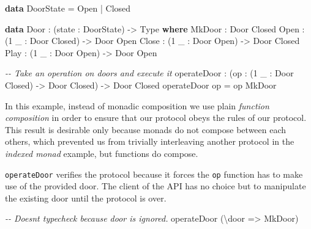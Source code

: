 \documentclass[
]{article}
\newenvironment{Shaded}{}{}
\newcommand{\CommentTok}[1]{\textcolor[rgb]{0.38,0.63,0.69}{\textit{#1}}}
\newcommand{\DataTypeTok}[1]{\textcolor[rgb]{0.56,0.13,0.00}{#1}}
\newcommand{\DecValTok}[1]{\textcolor[rgb]{0.25,0.63,0.44}{#1}}
\newcommand{\KeywordTok}[1]{\textcolor[rgb]{0.00,0.44,0.13}{\textbf{#1}}}
\newcommand{\NormalTok}[1]{#1}
\newcommand{\OperatorTok}[1]{\textcolor[rgb]{0.40,0.40,0.40}{#1}}
\newcommand{\OtherTok}[1]{\textcolor[rgb]{0.00,0.44,0.13}{#1}}
\begin{document}
\begin{Shaded}
\begin{Highlighting}[]

\KeywordTok{data} \DataTypeTok{DoorState} \OtherTok{=} \DataTypeTok{Open} \OperatorTok{|} \DataTypeTok{Closed}

\KeywordTok{data} \DataTypeTok{Door} \OperatorTok{:}\NormalTok{ (state }\OperatorTok{:} \DataTypeTok{DoorState}\NormalTok{) }\OtherTok{{-}\textgreater{}} \DataTypeTok{Type} \KeywordTok{where}
  \DataTypeTok{MkDoor} \OperatorTok{:} \DataTypeTok{Door} \DataTypeTok{Closed}
  \DataTypeTok{Open} \OperatorTok{:}\NormalTok{ (}\DecValTok{1}\NormalTok{ \_ }\OperatorTok{:} \DataTypeTok{Door} \DataTypeTok{Closed}\NormalTok{) }\OtherTok{{-}\textgreater{}} \DataTypeTok{Door} \DataTypeTok{Open}
  \DataTypeTok{Close} \OperatorTok{:}\NormalTok{ (}\DecValTok{1}\NormalTok{ \_ }\OperatorTok{:} \DataTypeTok{Door} \DataTypeTok{Open}\NormalTok{) }\OtherTok{{-}\textgreater{}} \DataTypeTok{Door} \DataTypeTok{Closed}
  \DataTypeTok{Play} \OperatorTok{:}\NormalTok{ (}\DecValTok{1}\NormalTok{ \_ }\OperatorTok{:} \DataTypeTok{Door} \DataTypeTok{Open}\NormalTok{) }\OtherTok{{-}\textgreater{}} \DataTypeTok{Door} \DataTypeTok{Open}

\CommentTok{{-}{-} Take an operation on doors and execute it}
\NormalTok{operateDoor }\OperatorTok{:}\NormalTok{ (op }\OperatorTok{:}\NormalTok{ (}\DecValTok{1}\NormalTok{ \_ }\OperatorTok{:} \DataTypeTok{Door} \DataTypeTok{Closed}\NormalTok{) }\OtherTok{{-}\textgreater{}} \DataTypeTok{Door} \DataTypeTok{Closed}\NormalTok{)}
           \OtherTok{{-}\textgreater{}} \DataTypeTok{Door} \DataTypeTok{Closed}
\NormalTok{operateDoor op }\OtherTok{=}\NormalTok{ op }\DataTypeTok{MkDoor}
\end{Highlighting}
\end{Shaded}

In this example, instead of monadic composition we use plain
\emph{function composition} in order to ensure that our protocol obeys
the rules of our protocol. This result is desirable only because monads
do not compose between each others, which prevented us from trivially
interleaving another protocol in the \emph{indexed monad} example, but
functions do compose.

\texttt{operateDoor} verifies the protocol because it forces the
\texttt{op} function has to make use of the provided door. The client of
the API has no choice but to manipulate the existing door until the
protocol is over.

\begin{Shaded}
\begin{Highlighting}[]
\CommentTok{{-}{-} Doesn\textquotesingle{}t typecheck because door is ignored.}
\NormalTok{operateDoor (\textbackslash{}door }\OtherTok{=\textgreater{}} \DataTypeTok{MkDoor}\NormalTok{) }
\end{Highlighting}
\end{Shaded}
\end{document}
